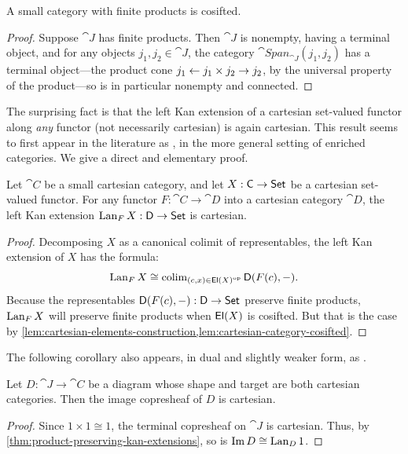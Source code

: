 \documentclass[11pt]{article}
\numberwithin{equation}{section}
\begin{document}
\begin{lemma}
  \label{lem:cartesian-category-cosifted}
  A small category with finite products is cosifted.
\end{lemma}
\begin{proof}
  Suppose $\cat{J}$ has finite products. Then $\cat{J}$ is nonempty, having a
  terminal object, and for any objects $j_1, j_2 \in \cat{J}$, the category
  $\cat{Span}_{\cat{J}}(j_1, j_2)$ has a terminal object---the product cone
  ${j_1 \leftarrow j_1 \times j_2 \to j_2}$, by the universal property of the
  product---so is in particular nonempty and connected.
\end{proof}

The surprising fact is that the left Kan extension of a cartesian set-valued
functor along \emph{any} functor (not necessarily cartesian) is again cartesian.
This result seems to first appear in the literature as \cite[\mbox{Theorem 1.5
  and Example 3.1}]{borceux1977}, in the more general setting of enriched
categories. We give a direct and elementary proof.

\begin{theorem}
  \label{thm:product-preserving-kan-extensions}
  Let $\cat{C}$ be a small cartesian category, and let $X: \mathsf{C} \to \mathsf{Set}$ be a
  cartesian set-valued functor. For any functor $F: \cat{C} \to \cat{D}$ into a
  cartesian category $\cat{D}$, the left Kan extension
  $\operatorname{Lan}_F X: \mathsf{D} \to \mathsf{Set}$ is cartesian.
\end{theorem}
\begin{proof}
  Decomposing $X$ as a canonical colimit of representables, the left Kan
  extension of $X$ has the formula:
  \begin{equation*}
    \operatorname{Lan}_F X \cong \operatorname{colim}_{(c,x) \in {\mathop{\mathsf{El}}(X)}^{\mathrm{op}}} \mathsf{D}(F(c), -).
  \end{equation*}
  Because the representables $\mathsf{D}(F(c), -): \mathsf{D} \to \mathsf{Set}$ preserve
  finite products, $\operatorname{Lan}_F X$ will preserve finite products when $\mathop{\mathsf{El}}(X)$ is
  cosifted. But that is the case by
  \cref{lem:cartesian-elements-construction,lem:cartesian-category-cosifted}.
\end{proof}

The following corollary also appears, in dual and slightly weaker form, as
\cite[\mbox{Proposition 6.5}]{pare1973}.

\begin{corollary}
  \label{cor:cartesian-image-copresheaf}
  Let $D: \cat{J} \to \cat{C}$ be a diagram whose shape and target are both
  cartesian categories. Then the image copresheaf of $D$ is cartesian.
\end{corollary}
\begin{proof}
  Since $1 \times 1 \cong 1$, the terminal copresheaf on $\cat{J}$ is cartesian.
  Thus, by \cref{thm:product-preserving-kan-extensions}, so is
  $\operatorname{Im} D \cong \operatorname{Lan}_D 1$.
\end{proof}
\end{document}
